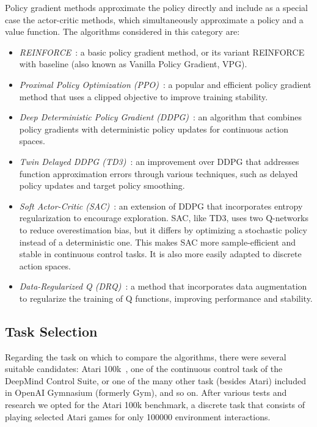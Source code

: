 Policy gradient methods approximate the policy directly and include as a special case the actor-critic methods, which simultaneously approximate a policy and a value function. The algorithms considered in this category are:
\begin{itemize}
	\item \textit{REINFORCE}~\cite[Chapter~13]{sutton:rl}: a basic policy gradient method, or its variant REINFORCE with baseline (also known as Vanilla Policy Gradient, VPG).
	\item \textit{Proximal Policy Optimization (PPO)}~\cite{schulman:ppo}: a popular and efficient policy gradient method that uses a clipped objective to improve training stability.
	\item \textit{Deep Deterministic Policy Gradient (DDPG)}~\cite{lillicrap:ddpg}: an algorithm that combines policy gradients with deterministic policy updates for continuous action spaces.
	\item \textit{Twin Delayed DDPG (TD3)~}\cite{fujimoto:td3}: an improvement over DDPG that addresses function approximation errors through various techniques, such as delayed policy updates and target policy smoothing.
	\item \textit{Soft Actor-Critic (SAC)}~\cite{haarnoja:sac}: an extension of DDPG that incorporates entropy regularization to encourage exploration. SAC, like TD3, uses two Q-networks to reduce overestimation bias, but it differs by optimizing a stochastic policy instead of a deterministic one. This makes SAC more sample-efficient and stable in continuous control tasks. It is also more easily adapted to discrete action spaces.
	\item \textit{Data-Regularized Q (DRQ)}~\cite{kostrikov:drq}: a method that incorporates data augmentation to regularize the training of Q functions, improving performance and stability.
\end{itemize}


\subsection{Task Selection}
\label{subsec:task_selection}

Regarding the task on which to compare the algorithms, there were several suitable candidates: Atari 100k~\cite{kaiser:atari100k}, one of the continuous control task of the DeepMind Control Suite, or one of the many other task (besides Atari) included in OpenAI Gymnasium (formerly Gym), and so on. After various tests and research we opted for the Atari 100k benchmark, a discrete task that consists of playing selected Atari games for only \num{100000} environment interactions.

